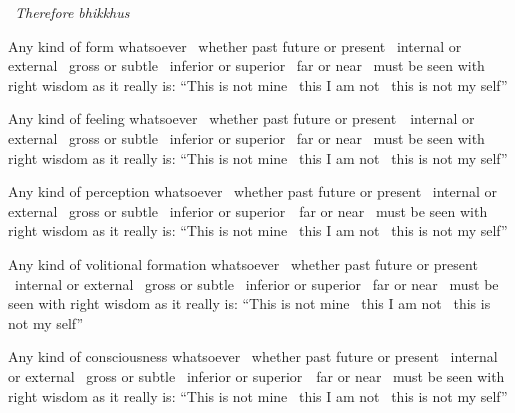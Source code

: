 \ifninebythirteen\clearpage\fi
\ifbfive\clearpage\fi

\begin{english-only-leader}
  \anglebracketleft\ \hspace{-0.5mm}\textit{Therefore bhikkhus} \hspace{-0.5mm}\anglebracketright\
\end{english-only-leader}
\begin{english-only-hang-together}
  Any kind of form whatsoever \breathmark\ whether past future or present \breathmark\ internal or external \breathmark\ gross or subtle \breathmark\ inferior or superior \breathmark\ far or near \breathmark\ must be seen with right wisdom as it really is: ``This is not mine \breathmark\ this I am not \breathmark\ this is not my self''
\end{english-only-hang-together}

\begin{english-only-hang}
  Any kind of feeling whatsoever \breathmark\ whether past future or \mbox{present}~\breathmark\ internal or external \breathmark\ gross or subtle \breathmark\ inferior or superior \breathmark\ far or near \breathmark\ must be seen with right wisdom as it really is: ``This is not mine \breathmark\ this I am not \breathmark\ this is not my self''
\end{english-only-hang}

\begin{english-only-hang}
  Any kind of perception whatsoever \breathmark\ whether past future or present \breathmark\ internal or external \breathmark\ gross or subtle \breathmark\ inferior or \mbox{superior}~\breathmark\ far or near \breathmark\ must be seen with right wisdom as it really is: ``This is not mine \breathmark\ this I am not \breathmark\ this is not my self''
\end{english-only-hang}

\begin{english-only-hang}
  Any kind of volitional formation whatsoever \breathmark\ whether past future or present \breathmark\ internal or external \breathmark\ gross or subtle \breathmark\ inferior or superior \breathmark\ far or near \breathmark\ must be seen with right wisdom as it really is: ``This is not mine \breathmark\ this I am not \breathmark\ this is not my self''
\end{english-only-hang}

\ifninebythirteen\clearpage\fi

\begin{english-only-hang}
  Any kind of consciousness whatsoever \breathmark\ whether past future or present \breathmark\ internal or external \breathmark\ gross or subtle \breathmark\ inferior or \mbox{superior}~\breathmark\ far or near \breathmark\ must be seen with right wisdom as it really is: ``This is not mine \breathmark\ this I am not \breathmark\ this is not my self''
\end{english-only-hang}

